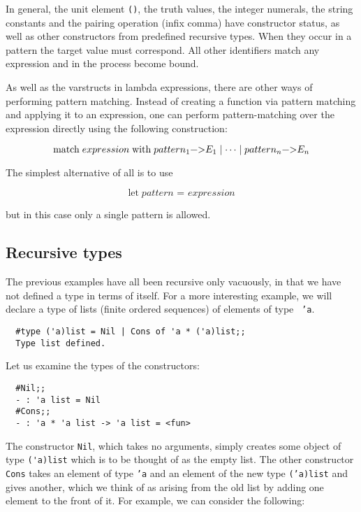 In general, the unit element {\tt ()}, the truth values, the integer numerals,
the string constants and the pairing operation (infix comma) have constructor
status, as well as other constructors from predefined recursive types. When
they occur in a pattern the target value must correspond. All other identifiers
match any expression and in the process become bound.

As well as the varstructs in lambda expressions, there are other ways of
performing pattern matching. Instead of creating a function via pattern
matching and applying it to an expression, one can perform pattern-matching
over the expression directly using the following construction:

$$ \mbox{match}\; expression\; \mbox{with}\;
   pattern_1 \mbox{\lstinline!->!} E_1 \mid \cdots \mid
   pattern_n \mbox{\lstinline!->!} E_n $$

\noindent The simplest alternative of all is to use

$$ \mbox{let}\; pattern \mbox{ = } expression $$

\noindent but in this case only a single pattern is allowed.

\subsection{Recursive types}

The previous examples have all been recursive only vacuously, in that we have
not defined a type in terms of itself. For a more interesting example, we will
declare a type of lists (finite ordered sequences) of elements of type {\tt
'a}.

\begin{boxed}\begin{verbatim}
  #type ('a)list = Nil | Cons of 'a * ('a)list;;
  Type list defined.
\end{verbatim}\end{boxed}

\noindent Let us examine the types of the constructors:

\begin{boxed}\begin{verbatim}
  #Nil;;
  - : 'a list = Nil
  #Cons;;
  - : 'a * 'a list -> 'a list = <fun>
\end{verbatim}\end{boxed}

The constructor {\tt Nil}, which takes no arguments, simply creates some object
of type {\verb+('a)list+} which is to be thought of as the empty list. The
other constructor {\tt Cons} takes an element of type {\tt 'a} and an element
of the new type {\tt ('a)list} and gives another, which we think of as arising
from the old list by adding one element to the front of it. For example, we can
consider the following:

